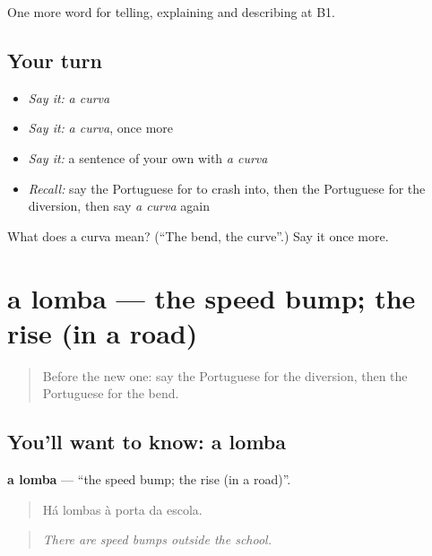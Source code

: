 \begin{grammarlens}[title={What you've built}]
One more word for telling, explaining and describing at B1.
\end{grammarlens}

\subsection*{Your turn}
\begin{itemize}
\raggedright
  \item \emph{Say it:} \emph{a curva}
  \item \emph{Say it:} \emph{a curva}, once more
  \item \emph{Say it:} a sentence of your own with \emph{a curva}
  \item \emph{Recall:} say the Portuguese for to crash into, then the Portuguese for the diversion, then say \emph{a curva} again
\end{itemize}

\begin{tcolorbox}[breakable,colback=teal!4,colframe=teal!35!black,title={Before you move on}]
What does a curva mean? (\textquotedblleft{}The bend, the curve\textquotedblright{}.) Say it once more.
\end{tcolorbox}
\section[a lomba]{a lomba — the speed bump; the rise (in a road)}

\label{lesson:PT-C410-lomba}



\begin{quote}
Before the new one: say the Portuguese for the diversion, then the Portuguese for the bend.
\end{quote}

\subsection*{You'll want to know: a lomba}
\textbf{a lomba} — \textquotedblleft{}the speed bump; the rise (in a road)\textquotedblright{}.

\begin{quote}
Há lombas à porta da escola.
\end{quote}

\begin{quote}
\emph{There are speed bumps outside the school.}
\end{quote}

